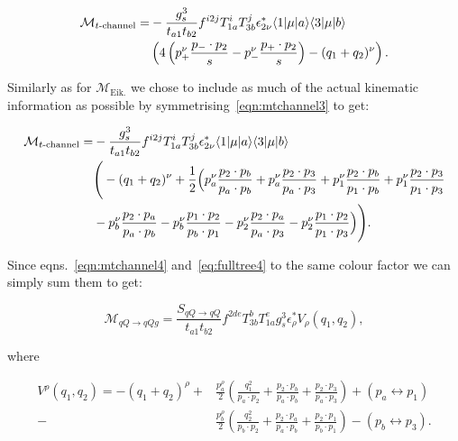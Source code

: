 		\begin{align}
		\begin{split}
			\mathcal{M}_{t\text{-channel}} = &-\frac{g_s^3}{t_{a1}t_{b2}}f^{i2j}T^i_{1a}T^j_{3b} \epsilon^*_{2\nu}
			\langle 1 | \mu | a \rangle\langle 3 | \mu | b \rangle \\&\left(4\left(p_+^\nu \frac{p_-\cdot p_2}{s} - p_-^\nu \frac{p_+\cdot p_2}{s}\right)
			- (q_1 + q_2)^\nu \right).
			\label{eqn:mtchannel3}
		\end{split}
		\end{align}

		Similarly as for $\mathcal{M}_{\text{Eik.}}$ we chose to include as much of the actual
		kinematic information as possible by symmetrising~\eqref{eqn:mtchannel3} to get:

		\begin{align}
		\begin{split}
			\mathcal{M}_{t\text{-channel}} = &-\frac{g_s^3}{t_{a1}t_{b2}}f^{i2j}T^i_{1a}T^j_{3b} \epsilon^*_{2\nu}
			\langle 1 | \mu | a \rangle\langle 3 | \mu | b \rangle\\
			&\Bigg(-(q_1 + q_2)^\nu + \frac{1}{2}\Big(
			p_a^\nu \frac{p_2\cdot p_b}{p_a\cdot p_b} + p_a^\nu \frac{p_2\cdot p_3}{p_a\cdot p_3} +
			p_1^\nu \frac{p_2\cdot p_b}{p_1\cdot p_b} + p_1^\nu \frac{p_2\cdot p_3}{p_1\cdot p_3}  \\
		       &-p_b^\nu \frac{p_2\cdot p_a}{p_a\cdot p_b} - p_b^\nu \frac{p_1\cdot p_2}{p_b\cdot p_1} -
			p_2^\nu \frac{p_2\cdot p_a}{p_a\cdot p_3} - p_2^\nu \frac{p_1\cdot p_2}{p_1\cdot p_3}
			\Big)
			\Bigg).
			\label{eqn:mtchannel4}
		\end{split}
		\end{align}

		Since eqns.~\eqref{eqn:mtchannel4} and~\eqref{eq:fulltree4} to the same colour factor we can simply sum
		them to get:

		\begin{equation}
			\mathcal{M}_{qQ\rightarrow qQg} = \frac{S_{qQ\rightarrow qQ}}{t_{a1}t_{b2}}
			f^{2de}T^b_{3b}T^e_{1a}g_s^3\epsilon^*_\rho V_\rho(q_1, q_2),
		\end{equation}

		where

		\begin{align}
			V^\rho(q_1, q_2) = -(q_1 + q_2)^\rho +
			&\frac{p_a^\rho}{2}\left(\frac{q^2_1}{p_a\cdot p_2} + \frac{p_2 \cdot p_b}{p_a \cdot p_b} +
			\frac{p_2 \cdot p_3}{p_a \cdot p_3}\right) + (p_a\leftrightarrow p_1) \\
			- &\frac{p_b^\rho}{2}\left(\frac{q^2_2}{p_b\cdot p_2} + \frac{p_2 \cdot p_a}{p_a \cdot p_b} +
			\frac{p_2 \cdot p_1}{p_b \cdot p_1}\right) - (p_b\leftrightarrow p_3).
			\label{eqn:effVertex}
		\end{align}

